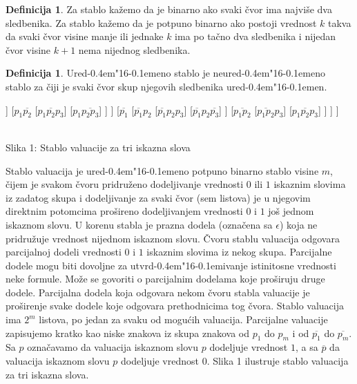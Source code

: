 \documentclass[12pt, a4paper, titlepage, twoside]{article}
\theoremstyle{definition}
\newtheorem{defn}[theorem]{Definicija}
\def\dj{d\kern-0.4em\char"16\kern-0.1em}
\begin{document}
\begin{defn}
Za stablo ka\v zemo da je binarno ako svaki \v cvor ima najvi\v se dva
sledbenika. Za stablo ka\v zemo da je potpuno binarno ako postoji vrednost $k$
takva da svaki \v cvor visine manje ili jednake $k$ ima po ta\v cno dva sledbenika i
nijedan \v cvor visine $k + 1$ nema nijednog sledbenika.
\end{defn}


\begin{defn}
Ure\dj{}eno stablo je neure\dj{}eno stablo za \v ciji je svaki \v cvor skup
njegovih sledbenika ure\dj{}en. 
\end{defn}


\begin{center}
\begin{forest}
[$\epsilon$
	[$p_1$
		[$p_1 p_2$
			[$p_1 p_2 p_3$]
			[$p_1 p_2 \overline{p_3}$]
		]
		[$p_1 \overline{p_2}$
			[$p_1 \overline{p_2} p_3$]
			[$p_1 \overline{{p}_2 {p}_3}$]
		]
	]
	[$\overline{p_1}$
		[$\overline{p_1} p_2$
			[$\overline{p_1} p_2 p_3$]
		   	[$\overline{p_1} p_2 \overline{p_3}$]
		]
		[$\overline{{p}_1 {p}_2}$
			[$\overline{{p}_1 {p}_2} p_3$]
		   	[$\overline{{p}_1 {p}_2 {p}_3}$]
		]
	]
]
\end{forest}		\\					
\vspace{0.2cm}
Slika 1: Stablo valuacije za tri iskazna slova				
\end{center}


Stablo valuacija je ure\dj{}eno potpuno binarno stablo visine $m$, \v cijem je svakom
\v cvoru pridru\v zeno dodeljivanje vrednosti $0$ ili $1$ iskaznim slovima iz zadatog
skupa i dodeljivanje za svaki \v cvor (sem listova) je u njegovim direktnim potomcima
pro\v sireno dodeljivanjem vrednosti $0$ i $1$ jo\v s jednom iskaznom slovu.
U korenu stabla je prazna dodela (ozna\v cena sa $\epsilon$) koja ne pridru\v zuje vrednost
nijednom iskaznom slovu. \v Cvoru stablu valuacija odgovara parcijalnoj dodeli
vrednosti $0$ i $1$ iskaznim slovima iz nekog skupa. Parcijalne dodele mogu biti
dovoljne za utvr\dj{}ivanje istinitosne vrednosti neke formule. Mo\v ze se govoriti
o parcijalnim dodelama koje pro\v siruju druge dodele. Parcijalna dodela koja
odgovara nekom \v cvoru stabla valuacije je pro\v sirenje svake dodele koje odgovara
prethodnicima tog \v cvora. Stablo valuacija ima $2^m$ listova, po jedan za
svaku od mogu\'cih valuacija. Parcijalne valuacije zapisujemo kratko kao niske
znakova iz skupa znakova od $p_1$ do $p_m$ i od $\overline{p_1}$ do $\overline{p_m}$. 
Sa $p$ ozna\v cavamo da valuacija iskaznom slovu $p$ dodeljuje vrednost $1$, a sa $\overline{p}$ 
da valuacija iskaznom slovu $p$ dodeljuje vrednost $0$. Slika 1 ilustruje stablo valuacija za 
tri iskazna slova.
\end{document}
